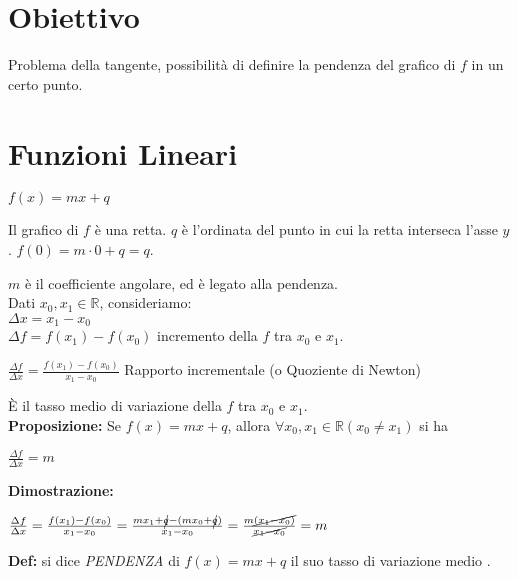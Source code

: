 \documentclass{article}
\newcommand*\circled[1]{\tikz[baseline=(char.base)]{
            \node[shape=circle,draw,inner sep=2pt] (char) {#1};}}
\begin{document}
\section{Obiettivo}
Problema della tangente, possibilità di definire la pendenza del grafico di $f$ in un certo punto.

\section{Funzioni Lineari}
\begin{center}
$f(x)=mx+q$\\
\end{center}Il grafico di $f$ è una retta.
$q$ è l'ordinata del punto in cui la retta interseca l'asse $y$. $f(0)=m\cdot 0+q=q$.
\begin{center}
\end{center}$m$ è il coefficiente angolare, ed è legato alla pendenza.
\\Dati $x_0, x_1 \in \mathbb{R}$, consideriamo:\\
$\Delta x = x_1 - x_0$ \\
$\Delta f = f(x_1) - f(x_0)$ incremento della $f$ tra $x_0$ e $x_1$.
\begin{mdframed}[backgroundcolor=red!20, linecolor=red] 
    $\frac{\Delta f}{\Delta x}= \frac{f(x_1)-f(x_0)}{x_1-x_0}$ Rapporto incrementale (o Quoziente di Newton)
\end{mdframed}
È il tasso medio di variazione della $f$ tra $x_0$ e $x_1$.\\
\textbf{Proposizione:}
Se $f(x)=mx+q$, allora $\forall x_0,x_1 \in \mathbb{R} (x_0 \neq x_1)$ si ha
\begin{center}
    $\frac{\Delta f}{\Delta x}=m$
\end{center}
\textbf{Dimostrazione:}
\begin{center}
    $\frac{\Delta f}{\Delta x}= \frac{f(x_1)-f(x_0)}{x_1-x_0}=\frac{mx_1+\cancel{q}-(mx_0+\cancel{q})}{x_1-x_0} = \frac{m\cancel{(x_1-x_0)}}{\cancel{x_1-x_0}}=m$
\end{center}
\textbf{Def:} si dice \textit{PENDENZA} di $f(x)=mx+q$ il suo tasso di variazione medio \circled{$m$}.
\end{document}
